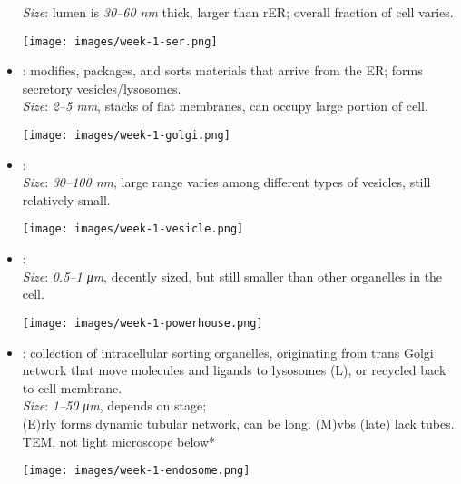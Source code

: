\begin{multicols}{2}
\begin{itemize}
  \textit{Size}: lumen is \emph{30--60 \si{nm}} thick, larger than rER\@; overall fraction of cell varies.
  \begin{center}
    \hspace{-30pt}\texttt{[image: images/week-1-ser.png]}
  \end{center}
  \item {}: modifies, packages, and sorts materials that arrive from the ER\@; forms secretory vesicles/lysosomes. \\
  \textit{Size}: \emph{2--5 \si{mm}}, stacks of flat membranes, can occupy large portion of cell.
  \begin{center}
    \hspace{-30pt}\texttt{[image: images/week-1-golgi.png]}
  \end{center}
  \item {}: \\
  \textit{Size}: \emph{30--100 \si{nm}}, large range varies among different types of vesicles, still relatively small.
  \begin{center}
    \hspace{-30pt}\texttt{[image: images/week-1-vesicle.png]}
  \end{center}
  \item {}: \\
  \textit{Size}: \emph{0.5--1 \si{\micro m}}, decently sized, but still smaller than other organelles in the cell.
  \begin{center}
    \hspace{-30pt}\texttt{[image: images/week-1-powerhouse.png]}
  \end{center}
  \item {}: collection of intracellular sorting organelles, originating from trans Golgi network that move molecules and ligands to lysosomes (L), or recycled back to cell membrane.\\
  \textit{Size}: \emph{1--50 \si{\micro m}}, depends on stage;\\
  (E)rly forms dynamic tubular network, can be long. %
  (M)vbs (late) lack tubes.\\ %
  TEM, not light microscope below*
  \begin{center}
    \hspace{-30pt}\texttt{[image: images/week-1-endosome.png]}
  \end{center}

\end{itemize}
\end{multicols}
